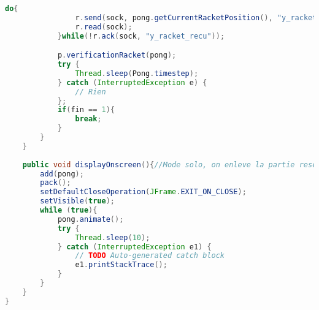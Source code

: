 \begin{lstlisting}[language=Java]
			do{
				r.send(sock, pong.getCurrentRacketPosition(), "y_racket");
				r.read(sock);
			}while(!r.ack(sock, "y_racket_recu"));

			p.verificationRacket(pong);
			try {
				Thread.sleep(Pong.timestep);
			} catch (InterruptedException e) {
				// Rien
			};
			if(fin == 1){
				break;
			}
		}
	}
		
	public void displayOnscreen(){//Mode solo, on enleve la partie reseau, et le score max de la fonction precedente
		add(pong);
		pack();
		setDefaultCloseOperation(JFrame.EXIT_ON_CLOSE);
		setVisible(true);
		while (true){
			pong.animate();
			try {
				Thread.sleep(10);
			} catch (InterruptedException e1) {
				// TODO Auto-generated catch block
				e1.printStackTrace();
			}
		}
	}
}
\end{lstlisting}